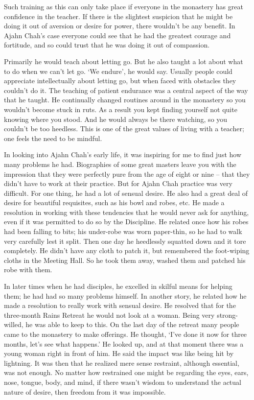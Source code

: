 Such training as this can only take place if everyone in the monastery
has great confidence in the teacher. If there is the slightest suspicion
that he might be doing it out of aversion or desire for power, there
wouldn't be any benefit. In Ajahn Chah's case everyone could see that he
had the greatest courage and fortitude, and so could trust that he was
doing it out of compassion.

Primarily he would teach about letting go. But he also taught a lot
about what to do when we can't let go. `We endure', he would say.
Usually people could appreciate intellectually about letting go, but
when faced with obstacles they couldn't do it. The teaching of patient
endurance was a central aspect of the way that he taught. He continually
changed routines around in the monastery so you wouldn't become stuck in
ruts. As a result you kept finding yourself not quite knowing where you
stood. And he would always be there watching, so you couldn't be too
heedless. This is one of the great values of living with a teacher; one
feels the need to be mindful.

In looking into Ajahn Chah's early life, it was inspiring for me to find
just how many problems he had. Biographies of some great masters leave
you with the impression that they were perfectly pure from the age
of eight or nine -- that they didn't have to work at their practice. But
for Ajahn Chah practice was very difficult. For one thing, he had a lot
of sensual desire. He also had a great deal of desire for beautiful
requisites, such as his bowl and robes, etc. He made a resolution in
working with these tendencies that he would never ask for anything, even
if it was permitted to do so by the Discipline. He related once how his
robes had been falling to bits; his under-robe was worn paper-thin, so
he had to walk very carefully lest it split. Then one day he heedlessly
squatted down and it tore completely. He didn't have any cloth to patch
it, but remembered the foot-wiping cloths in the Meeting Hall. So he
took them away, washed them and patched his robe with them.

In later times when he had disciples, he excelled in skilful means for
helping them; he had had so many problems himself. In another story, he
related how he made a resolution to really work with sensual desire. He
resolved that for the three-month Rains Retreat he would not look at a
woman. Being very strong-willed, he was able to keep to this. On the
last day of the retreat many people came to the monastery to make
offerings. He thought, `I've done it now for three months, let's see
what happens.' He looked up, and at that moment there was a young woman
right in front of him. He said the impact was like being hit by
lightning. It was then that he realized mere sense restraint, although
essential, was not enough. No matter how restrained one might be regarding
the eyes, ears, nose, tongue, body, and mind, if there wasn't wisdom to
understand the actual nature of desire, then freedom from it was
impossible.

